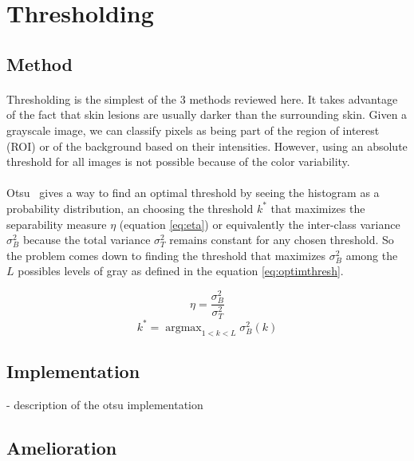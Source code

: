 \documentclass[a4paper,10pt]{article}
\DeclareMathOperator*{\argmax}{argmax}
\begin{document}
\section{Thresholding}
\subsection{Method}
\paragraph{}
Thresholding is the simplest of the 3 methods reviewed here. It takes advantage of the fact that skin lesions are 
usually darker than the surrounding skin. Given a grayscale image, we can 
classify pixels as being part of the region of interest (ROI) or of the 
background based on their intensities. However, using an absolute threshold for all images is not possible because of the color variability. 
\paragraph{} Otsu~\cite{Otsu1979} 
gives a way to find an optimal threshold by seeing the histogram as a probability distribution, an choosing the threshold $k^*$ that maximizes the separability measure $\eta$ (equation \ref{eq:eta}) or equivalently the inter-class variance $\sigma_B^2$ because the total variance $\sigma_T^2$ remains constant for any chosen threshold. So the problem comes down to finding the threshold that maximizes $\sigma_B^2$ among the $L$ possibles levels of gray as defined in the equation \ref{eq:optimthresh}. 

\begin{equation} \label{eq:eta}
\eta=\frac{\sigma_B^2}{\sigma_T^2} 
\end{equation}
\begin{equation} \label{eq:optimthresh}
  k^* = \argmax_{1<k<L} \sigma_B^2(k)   
\end{equation}

\subsection{Implementation}
- description of the otsu implementation

\subsection{Amelioration}
\end{document}
